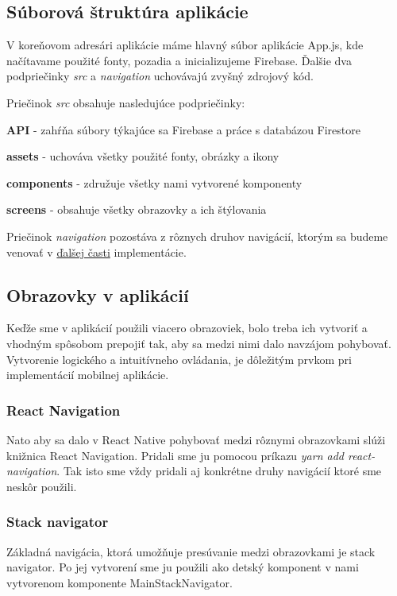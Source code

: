 \subsection{Súborová štruktúra aplikácie}
V koreňovom adresári aplikácie máme hlavný súbor aplikácie App.js, kde načítavame použité fonty, pozadia a inicializujeme Firebase. Ďalšie dva podpriečinky \textit{src} a \textit{navigation} uchovávajú zvyšný zdrojový kód. 

Priečinok \textit{src} obsahuje nasledujúce podpriečinky:
\begin{itemize}
\setlength\itemsep{0.1mm}
{\item \textbf{API} - zahŕňa súbory týkajúce sa Firebase a práce s databázou Firestore} 
{\item \textbf{assets} - uchováva všetky použité fonty, obrázky a ikony} 
{\item \textbf{components} - združuje všetky nami vytvorené komponenty} 
{\item \textbf{screens} - obsahuje všetky obrazovky a ich štýlovania}
\end{itemize}

Priečinok \textit{navigation} pozostáva z rôznych druhov navigácií, ktorým sa budeme venovať v \hyperref[sec:screens]{ďalšej časti} implementácie.

\subsection{Obrazovky v aplikácií}
\label{sec:screens}
Keďže sme v aplikácií použili viacero obrazoviek, bolo treba ich vytvoriť a vhodným spôsobom prepojiť tak, aby sa medzi nimi dalo navzájom pohybovať. Vytvorenie logického a intuitívneho ovládania, je dôležitým prvkom pri implementácií mobilnej aplikácie.
\subsubsection{React Navigation}
Nato aby sa dalo v React Native pohybovať medzi rôznymi obrazovkami slúži knižnica React Navigation. Pridali sme ju pomocou príkazu \textit{yarn add react-navigation}. Tak isto sme vždy pridali aj konkrétne druhy navigácií ktoré sme neskôr použili.
\subsubsection{Stack navigator}
Základná navigácia, ktorá umožňuje presúvanie medzi obrazovkami je stack navigator. Po jej vytvorení sme ju použili ako detský komponent v nami vytvorenom komponente MainStackNavigator. 

